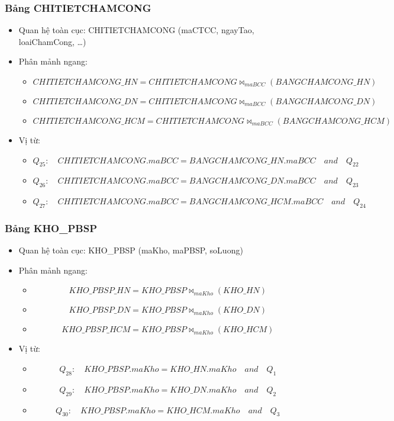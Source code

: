 \documentclass[a4paper,12pt]{report}
\begin{document}
\subsubsection{Bảng CHITIETCHAMCONG}
\begin{itemize}
    \item Quan hệ toàn cục:  CHITIETCHAMCONG (maCTCC, ngayTao, loaiChamCong, \ldots)
    \item Phân mảnh ngang:
        \begin{itemize}[label=]
            \item \[CHITIETCHAMCONG\_HN = CHITIETCHAMCONG \bowtie_{maBCC}(BANGCHAMCONG\_HN)\]
            \item \[CHITIETCHAMCONG\_DN = CHITIETCHAMCONG \bowtie_{maBCC}(BANGCHAMCONG\_DN)\]
            \item \[CHITIETCHAMCONG\_HCM = CHITIETCHAMCONG \bowtie_{maBCC}(BANGCHAMCONG\_HCM)\]
        \end{itemize}
    \item Vị từ:
    \begin{itemize}[label=]
        \item \[Q_{25}\colon\quad CHITIETCHAMCONG.maBCC = BANGCHAMCONG\_HN.maBCC \quad and \quad Q_{22}\]
        \item \[Q_{26}\colon\quad CHITIETCHAMCONG.maBCC = BANGCHAMCONG\_DN.maBCC \quad and \quad Q_{23} \]
        \item \[Q_{27}\colon\quad CHITIETCHAMCONG.maBCC = BANGCHAMCONG\_HCM.maBCC \quad and \quad Q_{24}\]
    \end{itemize}
\end{itemize}
\subsubsection{Bảng KHO\_PBSP}
\begin{itemize}
    \item Quan hệ toàn cục: KHO\_PBSP (maKho, maPBSP, soLuong)
    \item Phân mảnh ngang:
        \begin{itemize}[label=]
            \item \[KHO\_PBSP\_HN = KHO\_PBSP \bowtie_{maKho}(KHO\_HN)\]
            \item \[KHO\_PBSP\_DN = KHO\_PBSP \bowtie_{maKho}(KHO\_DN)\]
            \item \[KHO\_PBSP\_HCM = KHO\_PBSP \bowtie_{maKho}(KHO\_HCM)\]
        \end{itemize}
    \item Vị từ:
    \begin{itemize}[label=]
        \item \[Q_{28}\colon\quad KHO\_PBSP.maKho = KHO\_HN.maKho \quad and \quad Q_1\]
        \item \[Q_{29}\colon\quad KHO\_PBSP.maKho = KHO\_DN.maKho \quad and \quad Q_2 \]
        \item \[Q_{30}\colon\quad KHO\_PBSP.maKho = KHO\_HCM.maKho \quad and \quad Q_3\]
    \end{itemize}
\end{itemize}
\end{document}

